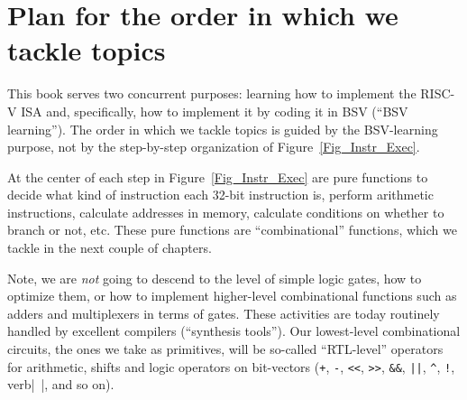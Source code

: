 
\section{Plan for the order in which we tackle topics}

This book serves two concurrent purposes: learning how to implement
the RISC-V ISA and, specifically, how to implement it by coding it in
BSV (``BSV learning'').  The order in which we tackle topics is guided
by the BSV-learning purpose, not by the step-by-step organization of
Figure~\ref{Fig_Instr_Exec}.

At the center of each step in Figure~\ref{Fig_Instr_Exec} are pure
functions to decide what kind of instruction each 32-bit instruction
is, perform arithmetic instructions, calculate addresses in memory,
calculate conditions on whether to branch or not, etc.  These pure
functions are ``combinational'' functions, which we tackle in the next
couple of chapters.

Note, we are \emph{not} going to descend to the level of simple logic
gates, how to optimize them, or how to implement higher-level
combinational functions such as adders and multiplexers in terms of
gates.  These activities are today routinely handled by excellent
compilers (``synthesis tools'').  Our lowest-level combinational
circuits, the ones we take as primitives, will be so-called
``RTL-level'' operators for arithmetic, shifts and logic operators on
bit-vectors (\verb|+|, \verb|-|, \verb|<<|, \verb|>>|, \verb|&&|,
\verb'||', \verb|^|, \verb|!|, verb|~|, and so on).

